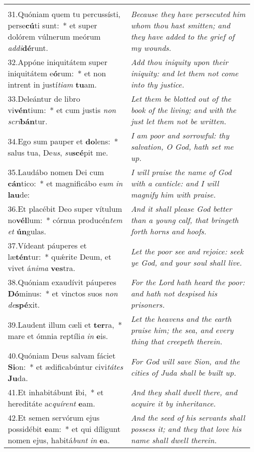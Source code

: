 \begin{longtable}{@{\hskip0pt} p{10cm} | p{6cm} @{\hskip0pt}}
{}\\
31.\enspace Quóniam quem tu percussísti, perse\textbf{cú}ti sunt:~* et super dolórem vúlnerum meórum \textit{ad}\textit{di}\textbf{dé}runt.
 & \textit{\small Because they have persecuted him whom thou hast smitten; and they have added to the grief of my wounds.
}\\
32.\enspace Appóne iniquitátem super iniquitátem e\textbf{ó}rum:~* et non intrent in justí\textit{ti}\textit{am} \textbf{tu}am.
 & \textit{\small Add thou iniquity upon their iniquity: and let them not come into thy justice.
}\\
33.\enspace Deleántur de libro vi\textbf{vén}tium:~* et cum justis \textit{non} \textit{scri}\textbf{bán}tur.
 & \textit{\small Let them be blotted out of the book of the living; and with the just let them not be written.
}\\
34.\enspace Ego sum pauper et \textbf{do}lens:~* salus tua, De\textit{us}, \textit{su}\textbf{scé}pit me.
 & \textit{\small I am poor and sorrowful: thy salvation, O God, hath set me up.
}\\
35.\enspace Laudábo nomen Dei cum \textbf{cán}tico:~* et magnificábo e\textit{um} \textit{in} \textbf{lau}de:
 & \textit{\small I will praise the name of God with a canticle: and I will magnify him with praise.
}\\
36.\enspace Et placébit Deo super vítulum no\textbf{vél}lum:~* córnua producén\textit{tem} \textit{et} \textbf{ún}gulas.
 & \textit{\small And it shall please God better than a young calf, that bringeth forth horns and hoofs.
}\\
37.\enspace Vídeant páuperes et læ\textbf{tén}tur:~* qu\'{\ae}rite Deum, et vivet á\textit{ni}\textit{ma} \textbf{ves}tra.
 & \textit{\small Let the poor see and rejoice: seek ye God, and your soul shall live.
}\\
38.\enspace Quóniam exaudívit páuperes \textbf{Dó}minus:~* et vinctos suos \textit{non} \textit{de}\textbf{spé}xit.
 & \textit{\small For the Lord hath heard the poor: and hath not despised his prisoners.
}\\
39.\enspace Laudent illum cæli et \textbf{ter}ra,~* mare et ómnia reptíli\textit{a} \textit{in} \textbf{e}is.
 & \textit{\small Let the heavens and the earth praise him; the sea, and every thing that creepeth therein.
}\\
40.\enspace Quóniam Deus salvam fáciet \textbf{Si}on:~* et ædificabúntur civi\textit{tá}\textit{tes} \textbf{Ju}da.
 & \textit{\small For God will save Sion, and the cities of Juda shall be built up.
}\\
41.\enspace Et inhabitábunt \textbf{i}bi,~* et hereditáte ac\textit{quí}\textit{rent} \textbf{e}am.
 & \textit{\small And they shall dwell there, and acquire it by inheritance.
}\\
42.\enspace Et semen servórum ejus possidébit \textbf{e}am:~* et qui díligunt nomen ejus, habitá\textit{bunt} \textit{in} \textbf{e}a. & \textit{\small And the seed of his servants shall possess it; and they that love his name shall dwell therein.}\\
\end{longtable}